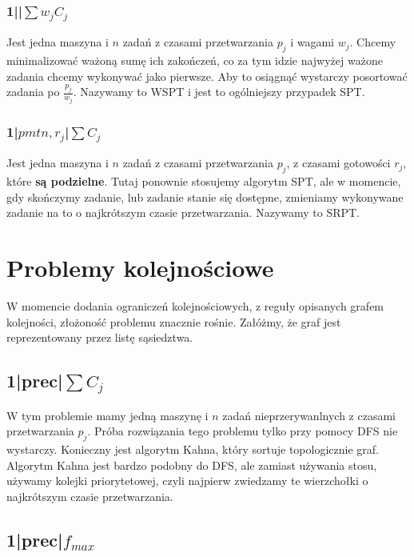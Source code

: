\documentclass{../notatki}
\begin{document}
\subsubsection{1||\texorpdfstring{$\sum w_jC_j$}{sum wjCj}}

Jest jedna maszyna i $n$ zadań z czasami przetwarzania $p_j$ i wagami $w_j$.
Chcemy minimalizować ważoną sumę ich zakończeń, co za tym idzie najwyżej ważone
zadania chcemy wykonywać jako pierwsze. Aby to osiągnąć wystarczy posortować
zadania po $\frac{p_j}{w_j}$. Nazywamy to WSPT i jest to ogólniejszy przypadek
SPT.

\subsubsection{1|\texorpdfstring{$pmtn, r_j$}{pmtn,
rj}|\texorpdfstring{$\sum C_j$}{sum Cj}}

Jest jedna maszyna i $n$ zadań z czasami przetwarzania $p_j$, z
czasami gotowości
$r_j$, które \textbf{są podzielne}. Tutaj ponownie stosujemy algorytm SPT,
ale w momencie, gdy skończymy zadanie, lub zadanie stanie się dostępne,
zmieniamy wykonywane zadanie na to o najkrótszym czasie przetwarzania.
Nazywamy to SRPT.

\section{Problemy kolejnościowe}

W momencie dodania ograniczeń kolejnościowych, z reguły opisanych grafem
kolejności, złożoność problemu znacznie rośnie. Załóżmy, że graf
jest reprezentowany przez listę sąsiedztwa.

\subsection{1|prec|\texorpdfstring{$\sum C_j$}{sum Cj}}

W tym problemie mamy jedną maszynę i $n$ zadań nieprzerywanlnych z
czasami przetwarzania $p_j$.
Próba rozwiązania tego problemu tylko przy pomocy DFS nie wystarczy.
Konieczny jest algorytm Kahna, który sortuje topologicznie graf.
Algorytm Kahna jest bardzo podobny do DFS, ale zamiast używania stosu,
używamy kolejki priorytetowej, czyli najpierw zwiedzamy te wierzchołki o
najkrótszym czasie przetwarzania.

\subsection{1|prec|\texorpdfstring{$f_{max}$}{fmax}}
\end{document}

